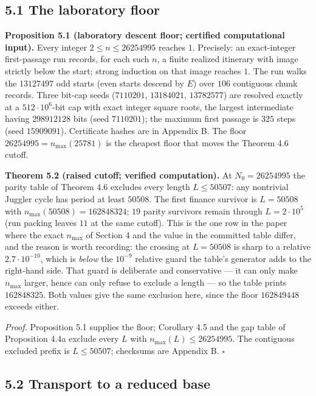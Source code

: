\documentclass[12pt]{article}
\begin{document}
\subsection{5.1 The laboratory floor}\label{the-laboratory-floor}

\textbf{Proposition 5.1 (laboratory descent floor; certified
computational input).} Every integer \(2\le n\le 26254995\) reaches
\(1\). Precisely: an exact-integer first-passage run records, for each
such \(n\), a finite realized itinerary with image strictly below the
start; strong induction on that image reaches \(1\). The run walks the
\(13127497\) odd starts (even starts descend by \(E\)) over \(106\)
contiguous chunk records. Three bit-cap seeds (\(7110201\),
\(13184021\), \(13782577\)) are resolved exactly at a
\(512\cdot 10^6\)-bit cap with exact integer square roots, the largest
intermediate having \(298912128\) bits (seed \(7110201\)); the maximum
first passage is \(325\) steps (seed \(15909091\)). Certificate hashes
are in Appendix B. The floor \(26254995=n_{\max}(25781)\) is the
cheapest floor that moves the Theorem 4.6 cutoff.

\textbf{Theorem 5.2 (raised cutoff; verified computation).} At
\(N_0=26254995\) the parity table of Theorem 4.6 excludes every length
\(L\le 50507\): any nontrivial Juggler cycle has period at least
\(50508\). The first finance survivor is \(L=50508\) with
\(n_{\max}(50508)=162848324\); \(19\) parity survivors remain through
\(L=2\cdot 10^5\) (run packing leaves \(11\) at the same cutoff). This
is the one row in the paper where the exact \(n_{\max}\) of Section 4
and the value in the committed table differ, and the reason is worth
recording: the crossing at \(L=50508\) is sharp to a relative
\(2.7\cdot10^{-10}\), which is \emph{below} the \(10^{-9}\) relative
guard the table's generator adds to the right-hand side. That guard is
deliberate and conservative --- it can only make \(n_{\max}\) larger,
hence can only refuse to exclude a length --- so the table prints
\(162848325\). Both values give the same exclusion here, since the floor
\(162849448\) exceeds either.

\emph{Proof.} Proposition 5.1 supplies the floor; Corollary 4.5 and the
gap table of Proposition 4.4a exclude every \(L\) with
\(n_{\max}(L)\le 26254995\). The contiguous excluded prefix is
\(L\le 50507\); checksums are Appendix B. \(\square\)

\subsection{5.2 Transport to a reduced
base}\label{transport-to-a-reduced-base}
\end{document}
